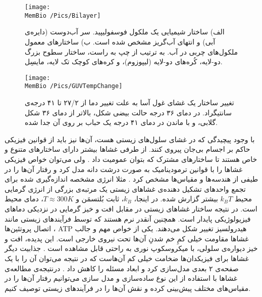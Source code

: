 \begin{figure}[h]
\begin{center}
\texttt{[image: \\MemBio /Pics/Bilayer]}
\caption{
الف) ساختار شیمیایی یک ملکول فوسفولیپید. سر آب‌دوست (دایره‌ی آبی) و  انتهای آب‌گریز مشخص شده است. ب) ساختار‌های معمول ملکول‌های چربی در آب. به ترتیب از چپ به راست، ساختار سطوح بزرگ دو-لایه، کُره‌های دو-لایه (لیپوزوم)، و کره‌های کوچک تک لایه، مایسِل.
}
\label{fig:bilayer}
\end{center}
\end{figure}




\begin{figure}[h]
\begin{center}
\texttt{[image: \\MemBio /Pics/GUVTempChange]}
\caption{
تغییر ساختار یک غشای غول ‌آسا به علت تغییر دما از ۲۷/۲ تا ۴۱ درجه‌ی سانتیگراد. در دمای ۳۶ درجه حالت بیضی شکل، بالاتر از دمای ۳۶ شکل گلابی، و با ماندن در دمای ۴۱ درجه یک حباب بر روی آن جدا شده.
}
\label{fig:GUVTempChange}
\end{center}
\end{figure}






با وجود پیچیدگی‌ که در غشای سلول‌های زیستی هست، آن‌ها نیز باید از قوانین فیزیکی حاکم بر اجسام بی‌جان پیروی کنند. از طرفی غشا‌ها بیشتر دارای ساختارهای متنوع و خاص هستند تا ساختارهای مشترک که بتوان عمومیت داد
\cite{NelsonBook2004}.
ولی می‌توان خواص فیزیکی غشاها را با قوانین ترمودینامیک به صورت درشت دانه مدل کرد و رفتار‌ آن‌ها را در طیفی از هندسه‌ها و مقیاس‌ها مشخص کرد
\cite{Seifert1997}.
 مثلا انرژی مشخصه اندازه‌گیری شده برای تجمع واحد‌های تشکیل‌ دهنده‌ی غشاهای زیستی یک مرتبه‌ی بزرگی از انرژی گرمایی محیط 
$k_BT$
بیشتر گزارش شده. در اینجا، 
$k_B$،
ثابت بُلتسمَن و 
$T\approx300K$،
دمای محیط است. در نتیجه ساختار غشاهای زیستی در مقابل افت و خیز گرمایی در نزدیکی دماهای فیزیولوژیکی پایدار است. همچنین آنقدر نرم  هستند که توسط فرآیندهای زیستی مانند اتصال پروتئین‌ها
\cite{NelsonBook2004,Seifert1997,Deserno2015}،
ATP
هیدرولسیز
\cite{Boyle2008Biology,Lipowskyb1995ook}
تغییر شکل می‌دهند.
یکی از خواص مهم و جالب غشاها مقاومت خیلی کمِ خم شدنِ آن‌ها تحت نیروی خارجی است. این پدیده، افت و خیز دیواره‌ی سلولی، با میکروسکوپ نوری به راحتی قابل مشاهده است
\cite{NelsonBook2004}.
جذابیت دیگر غشا‌ها برای فیزیکدان‌ها ضخامت خیلی کم آن‌هاست که در نتیجه می‌توان آن را با یک صفحه‌ی ۲ بعدی مدل‌سازی کرد و ابعاد مسئله‌ را کاهش داد
\cite{Seifert1997,Deserno2015}.
درنتیجه‌ی مطالعه‌ی غشاها با استفاده از این نوع ساده‌سازی و مدل سازی می‌توانیم  رفتار آن‌ها را در مقیاس‌های مختلف پیش‌بینی کرده و نقش‌ آن‌ها را در فرآیند‌های زیستی توصیف کنیم.



